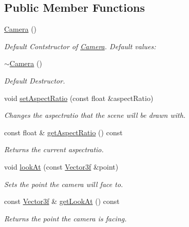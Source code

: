 \subsection*{Public Member Functions}
\begin{DoxyCompactItemize}
\item 
\hyperlink{classburn_1_1_camera_aa0eac6e197cfbebe709b524eae890a02}{Camera} ()
\begin{DoxyCompactList}\small\item\em Default Contstructor of \hyperlink{classburn_1_1_camera}{Camera}. Default values\-: \end{DoxyCompactList}\item 
\hyperlink{classburn_1_1_camera_a717df173cafcdce81c01eb6744332ae7}{$\sim$\-Camera} ()
\begin{DoxyCompactList}\small\item\em Default Destructor. \end{DoxyCompactList}\item 
void \hyperlink{classburn_1_1_camera_ac3ebe6eb9c44fe8068e397c8e22b5c72}{set\-Aspect\-Ratio} (const float \&aspect\-Ratio)
\begin{DoxyCompactList}\small\item\em Changes the aspectratio that the scene will be drawn with. \end{DoxyCompactList}\item 
const float \& \hyperlink{classburn_1_1_camera_acfc5ac1419ae2c5f13da44a518b77ac2}{get\-Aspect\-Ratio} () const 
\begin{DoxyCompactList}\small\item\em Returns the current aspectratio. \end{DoxyCompactList}\item 
void \hyperlink{classburn_1_1_camera_aacfbde225b770a51a020ec15403b1c41}{look\-At} (const \hyperlink{namespaceburn_a9d6d349c94bc4dc9699427216128a0ef}{Vector3f} \&point)
\begin{DoxyCompactList}\small\item\em Sets the point the camera will face to. \end{DoxyCompactList}\item 
const \hyperlink{namespaceburn_a9d6d349c94bc4dc9699427216128a0ef}{Vector3f} \& \hyperlink{classburn_1_1_camera_a8200343828523c5a7d5247d9dbe66545}{get\-Look\-At} () const 
\begin{DoxyCompactList}\small\item\em Returns the point the camera is facing. \end{DoxyCompactList}\item 

\end{DoxyCompactItemize}
